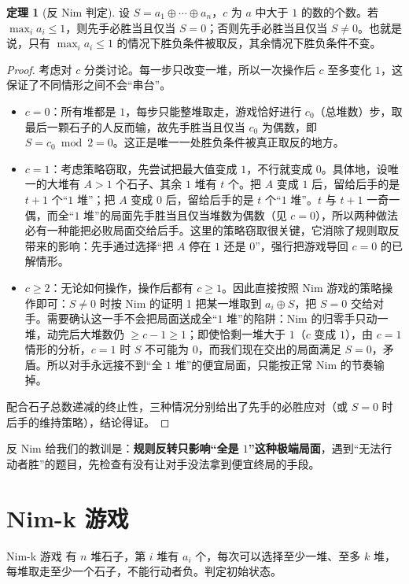 \documentclass[UTF8,a4paper,11pt,oneside,openany,fontset=fandol]{ctexbook}
\theoremstyle{definition}
\newtheorem{theorem}[definition]{定理}
\begin{document}
\begin{theorem}[反 Nim 判定]\label{thm:antinim}
设 $S=a_1\oplus\cdots\oplus a_n$，$c$ 为 $a$ 中大于 $1$ 的数的个数。若 $\max_i a_i\le1$，则先手必胜当且仅当 $S=0$；否则先手必胜当且仅当 $S\ne0$。也就是说，只有 $\max_i a_i\le1$ 的情况下胜负条件被取反，其余情况下胜负条件不变。
\end{theorem}
\begin{proof}
考虑对 $c$ 分类讨论。每一步只改变一堆，所以一次操作后 $c$ 至多变化 $1$，这保证了不同情形之间不会“串台”。
\begin{itemize}
\item $c=0$：所有堆都是 $1$，每步只能整堆取走，游戏恰好进行 $c_0$（总堆数）步，取最后一颗石子的人反而输，故先手胜当且仅当 $c_0$ 为偶数，即 $S=c_0\bmod 2=0$。这正是唯一一处胜负条件被真正取反的地方。
\item $c=1$：考虑策略窃取，先尝试把最大值变成 $1$，不行就变成 $0$。具体地，设唯一的大堆有 $A>1$ 个石子、其余 $1$ 堆有 $t$ 个。把 $A$ 变成 $1$ 后，留给后手的是 $t+1$ 个“$1$ 堆”；把 $A$ 变成 $0$ 后，留给后手的是 $t$ 个“$1$ 堆”。$t$ 与 $t+1$ 一奇一偶，而全“$1$ 堆”的局面先手胜当且仅当堆数为偶数（见 $c=0$），所以两种做法必有一种能把必败局面交给后手。这里的策略窃取很关键，它消除了规则取反带来的影响：先手通过选择“把 $A$ 停在 $1$ 还是 $0$”，强行把游戏导回 $c=0$ 的已解情形。
\item $c\ge2$：无论如何操作，操作后都有 $c\ge1$。因此直接按照 Nim 游戏的策略操作即可：$S\ne0$ 时按 Nim 的证明 1 把某一堆取到 $a_i\oplus S$，把 $S=0$ 交给对手。需要确认这一手不会把局面送成全“$1$ 堆”的陷阱：Nim 的归零手只动一堆，动完后大堆数仍 $\ge c-1\ge1$；即使恰剩一堆大于 $1$（$c$ 变成 $1$），由 $c=1$ 情形的分析，$c=1$ 时 $S$ 不可能为 $0$，而我们现在交出的局面满足 $S=0$，矛盾。所以对手永远接不到“全 $1$ 堆”的便宜局面，只能按正常 Nim 的节奏输掉。
\end{itemize}
配合石子总数递减的终止性，三种情况分别给出了先手的必胜应对（或 $S=0$ 时后手的维持策略），结论得证。
\end{proof}

反 Nim 给我们的教训是：\textbf{规则反转只影响“全是 $1$”这种极端局面}，遇到“无法行动者胜”的题目，先检查有没有让对手没法拿到便宜终局的手段。

\section{Nim-k 游戏}
\begin{problem}{Nim-k 游戏}
有 $n$ 堆石子，第 $i$ 堆有 $a_i$ 个，每次可以选择至少一堆、至多 $k$ 堆，每堆取走至少一个石子，不能行动者负。判定初始状态。
\end{problem}
\end{document}
